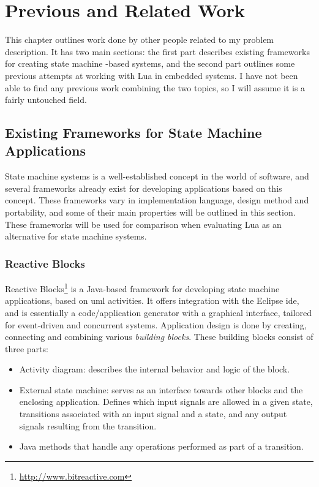\chapter{Previous and Related Work}
\label{ch:related_work}
This chapter outlines work done by other people related to my problem description. It has two main sections: the first part describes existing frameworks for creating state machine -based systems, and the second part outlines some previous attempts at working with Lua in embedded systems. I have not been able to find any previous work combining the two topics, so I will assume it is a fairly untouched field.

\section{Existing Frameworks for State Machine Applications}
\label{sec:existing_frameworks_state_machine}
State machine systems is a well-established concept in the world of software, and several frameworks already exist for developing applications based on this concept. These frameworks vary in implementation language, design method and portability, and some of their main properties will be outlined in this section. These frameworks will be used for comparison when evaluating Lua as an alternative for state machine systems.

\subsection{Reactive Blocks}
\label{sec:reactive_blocks}
Reactive Blocks\footnote{\url{http://www.bitreactive.com}} is a Java-based framework for developing state machine applications, based on \gls{uml} activities. It offers integration with the Eclipse \gls{ide}, and is essentially a code/application generator with a graphical interface, tailored for event-driven and concurrent systems. Application design is done by creating, connecting and combining various \emph{building blocks}. These building blocks consist of three parts:

\begin{itemize}
	\item Activity diagram: describes the internal behavior and logic of the block.
	\item External state machine: serves as an interface towards other blocks and the enclosing application. Defines which input signals are allowed in a given state, transitions associated with an input signal and a state, and any output signals resulting from the transition.
	\item Java methods that handle any operations performed as part of a transition.
\end{itemize}

